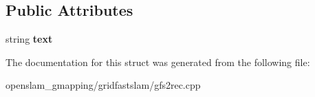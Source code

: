 \subsection*{Public Attributes}
\begin{DoxyCompactItemize}
\item 
\mbox{\label{structCommentRecord_adc251cf91b696b4dbd96c2301a24869b}} 
string {\bfseries text}
\end{DoxyCompactItemize}


The documentation for this struct was generated from the following file\+:\begin{DoxyCompactItemize}
\item 
openslam\+\_\+gmapping/gridfastslam/gfs2rec.\+cpp\end{DoxyCompactItemize}
